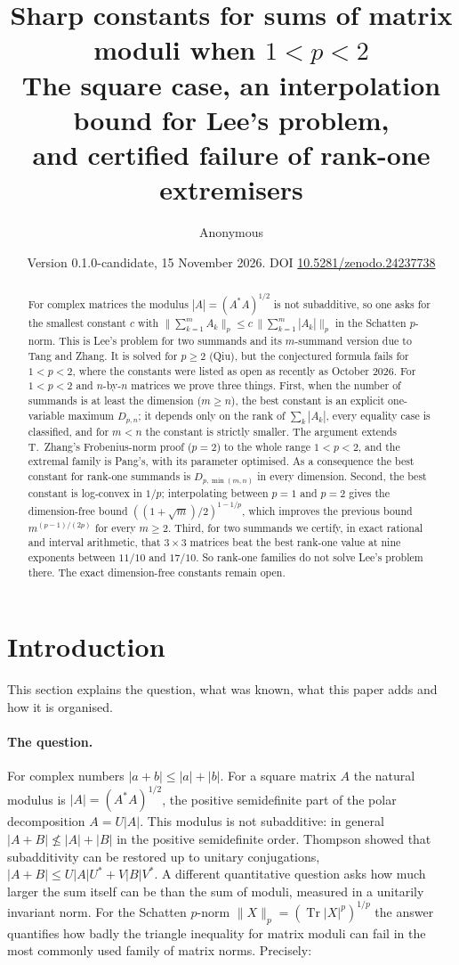 \documentclass[11pt,a4paper]{article}
\title{Sharp constants for sums of matrix moduli when \(1<p<2\)\\[0.35em]
  \large The square case, an interpolation bound for Lee's problem,\\
  and certified failure of rank-one extremisers}
\author{Anonymous}
\date{Version 0.1.0-candidate, 15 November 2026. DOI \href{https://doi.org/10.5281/zenodo.24237738}{10.5281/zenodo.24237738}}
\numberwithin{equation}{section}
\theoremstyle{definition}
\theoremstyle{remark}
\DeclareMathOperator{\Tr}{Tr}
\begin{document}
\maketitle

\begin{abstract}
For complex matrices the modulus \(|A|=(A^*A)^{1/2}\) is not subadditive,
so one asks for the smallest constant \(c\) with
\(\|\sum_{k=1}^mA_k\|_p\le c\,\|\sum_{k=1}^m|A_k|\|_p\) in the Schatten
\(p\)-norm. This is Lee's problem for two summands and its
\(m\)-summand version due to Tang and Zhang. It is solved for
\(p\ge2\) (Qiu), but the conjectured formula fails for \(1<p<2\), where
the constants were listed as open as recently as October 2026. For
\(1<p<2\) and \(n\)-by-\(n\) matrices we prove three things. First,
when the number of summands is at least the dimension (\(m\ge n\)), the
best constant is an explicit one-variable maximum \(D_{p,n}\); it
depends only on the rank of \(\sum_k|A_k|\), every equality case is
classified, and for \(m<n\) the constant is strictly smaller. The
argument extends T.~Zhang's Frobenius-norm proof (\(p=2\)) to the whole
range \(1<p<2\), and the extremal family is Pang's, with its parameter
optimised. As a consequence the best constant for rank-one summands is
\(D_{p,\min(m,n)}\) in every dimension. Second, the best constant is
log-convex in \(1/p\); interpolating between \(p=1\) and \(p=2\) gives the
dimension-free bound \(((1+\sqrt m)/2)^{1-1/p}\), which improves the
previous bound \(m^{(p-1)/(2p)}\) for every \(m\ge2\). Third, for two
summands we certify, in exact rational and interval arithmetic, that
\(3\times3\) matrices beat the best rank-one value at nine exponents
between \(11/10\) and \(17/10\). So rank-one families do not solve
Lee's problem there. The exact dimension-free constants remain open.
\end{abstract}

\tableofcontents

\section{Introduction}\label{sec:intro}

This section explains the question, what was known, what this paper
adds and how it is organised.

\paragraph{The question.}
For complex numbers \(|a+b|\le|a|+|b|\). For a square matrix \(A\)
the natural modulus is \(|A|=(A^*A)^{1/2}\), the positive semidefinite
part of the polar decomposition \(A=U|A|\). This modulus is not
subadditive: in general \(|A+B|\not\le|A|+|B|\) in the positive
semidefinite order. Thompson \cite{Thompson} showed that subadditivity can be restored
up to unitary conjugations, \(|A+B|\le U|A|U^*+V|B|V^*\). A different
quantitative question asks how much larger the sum itself can be than
the sum of moduli, measured in a unitarily invariant norm. For the
Schatten \(p\)-norm \(\|X\|_p=(\Tr|X|^p)^{1/p}\) the answer quantifies how badly
the triangle inequality for matrix moduli can fail in the most commonly
used family of matrix norms. Precisely:
\end{document}
